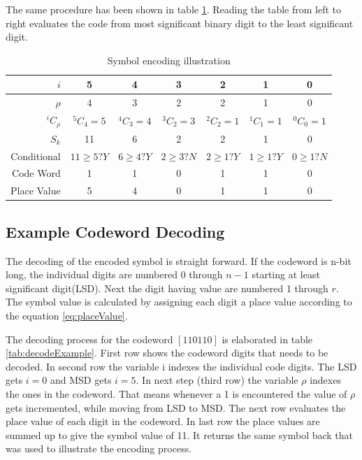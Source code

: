 The same procedure has been shown in table \ref{tab:encodeExample}. Reading the table from left to right evaluates the code from most significant binary digit to the least significant digit.
\begin{table}[!htbp]
\caption{Symbol encoding illustration}
\begin{tabular}{|r||c|c|c|c|c|c|} 
\hline
$i$ & 5 & 4 & 3 & 2 & 1 & 0 \\  \hline
$\rho$ & 4 & 3 & 2 & 2 & 1 & 0 \\  \hline
$^iC_{\rho}$ & $^5C_4=5$ & $^4C_3=4$ & $^3C_2=3$ & $^2C_2=1$ & $^1C_1=1$ & $^0C_0=1$ \\  \hline
$S_k$ & 11 & 6 & 2 & 2 & 1 & 0 \\  \hline
Conditional & $11\geq5? Y$ & $6\geq4? Y$ & $2\geq3? N$ & $2\geq1? Y$ & $1\geq1? Y$ & $0\geq1? N$ \\  \hline
Code Word & 1 & 1 & 0 & 1 & 1 & 0 \\  \hline
Place Value & 5 & 4 & 0 & 1 & 1 & 0 \\  \hline
\end{tabular}
\label{tab:encodeExample}
\end{table}

%

\subsection{Example Codeword Decoding}

The decoding of the encoded symbol is straight forward. If the codeword is n-bit long, the individual digits are numbered 0 through $n-1$ starting at least significant digit(LSD). Next the digit having value are numbered 1 through $r$. The symbol value is calculated by assigning each digit a place value according to the equation \ref{eq:placeValue}. 

The decoding process for the codeword $[110110] $ is elaborated in table \ref{tab:decodeExample}. First row shows the codeword digits that needs to be decoded. In second row the variable i indexes the individual code digits. The LSD gets $i=0$ and MSD gets $i=5$. 
In next step (third row) the variable $\rho$ indexes the ones in the codeword. That means whenever a 1 is encountered the value of $\rho$ gets incremented, while moving from LSD to MSD. The next row evaluates the place value of each digit in the codeword. In last row the place values are summed up to give the symbol value of 11. It returns the same symbol back that was used to illustrate the encoding process.

